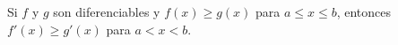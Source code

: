 \item Si $f$ y $g$ son diferenciables y $f(x) \ge g(x)$ para $a \le x \le b$, entonces $f'(x) \ge g'(x)$ para $a < x < b$.
